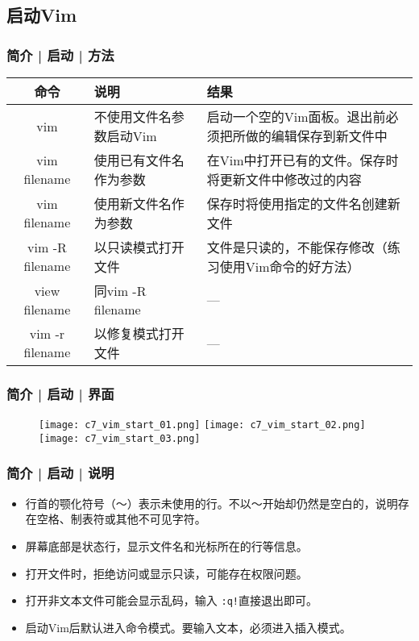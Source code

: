 \subsection{启动Vim}
\begin{frame}
  \frametitle{简介 | 启动 | \alert{方法}}
  \begin{table}
    \centering
    \begin{tabularx}{\textwidth}{cXX}
      \hline
      \rowcolor{blue!50}命令 & 说明 & 结果\\
      \hline
      vim & 不使用文件名参数启动Vim & 启动一个空的Vim面板。退出前必须把所做的编辑保存到新文件中\\
      vim filename & 使用已有文件名作为参数 & 在Vim中打开已有的文件。保存时将更新文件中修改过的内容\\
      vim filename & 使用新文件名作为参数 & 保存时将使用指定的文件名创建新文件\\
      vim -R filename & 以只读模式打开文件 & 文件是只读的，不能保存修改（练习使用Vim命令的好方法）\\
      view filename & 同vim -R filename & ---\\
      vim -r filename & 以修复模式打开文件 & ---\\
      \hline
    \end{tabularx}
  \end{table}
\end{frame}

\begin{frame}
  \frametitle{简介 | 启动 | 界面}
  \begin{figure}
    \centering
    \texttt{[image: c7\_vim\_start\_01.png]}\quad
    \texttt{[image: c7\_vim\_start\_02.png]}\\
    \texttt{[image: c7\_vim\_start\_03.png]}
  \end{figure}
\end{frame}

\begin{frame}[fragile]
  \frametitle{简介 | 启动 | 说明}
  \begin{itemize}[<+->]
    \item 行首的颚化符号（～）表示未使用的行。不以～开始却仍然是空白的，说明存在空格、制表符或其他不可见字符。
    \item 屏幕底部是状态行，显示文件名和光标所在的行等信息。
    \item 打开文件时，拒绝访问或显示只读，可能存在权限问题。
    \item 打开非文本文件可能会显示乱码，输入 \verb|:q!|直接退出即可。
    \item 启动Vim后默认进入命令模式。要输入文本，必须进入插入模式。
  \end{itemize}
\end{frame}

